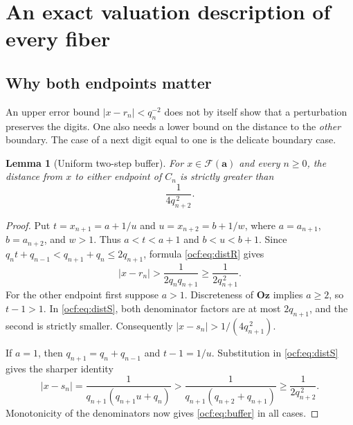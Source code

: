 \documentclass[11pt,a4paper]{article}
\numberwithin{equation}{section}
\newtheorem{lemma}[theorem]{Lemma}
\theoremstyle{definition}
\theoremstyle{remark}
\newcommand{\Oz}{\mathbf{Oz}}
\newcommand{\F}{\mathcal F}
\newcommand{\codea}{\boldsymbol a}
\begin{document}
\section{An exact valuation description of every fiber}
\label{ocf:sec:fibers}

\subsection{Why both endpoints matter}

An upper error bound $|x-r_n|<q_n^{-2}$ does not by itself show that a
perturbation preserves the digits. One also needs a lower bound on the
distance to the \emph{other} boundary. The case of a next digit equal to
one is the delicate boundary case.

\begin{lemma}[Uniform two-step buffer]\label{ocf:lem:buffer}
For $x\in\F(\codea)$ and every $n\ge0$, the distance from $x$ to either
endpoint of $C_n$ is strictly greater than
\begin{equation}\label{ocf:eq:buffer}
 \frac1{4q_{n+2}^{\,2}}.
\end{equation}
\end{lemma}
\begin{proof}
Put $t=x_{n+1}=a+1/u$ and $u=x_{n+2}=b+1/w$, where
$a=a_{n+1}$, $b=a_{n+2}$, and $w>1$. Thus $a<t<a+1$ and $b<u<b+1$.
Since $q_nt+q_{n-1}<q_{n+1}+q_n\le2q_{n+1}$, formula
\eqref{ocf:eq:distR} gives
\[
 |x-r_n|>\frac1{2q_nq_{n+1}}\ge\frac1{2q_{n+1}^{\,2}}.
\]
For the other endpoint first suppose $a>1$. Discreteness of $\Oz$ implies
$a\ge2$, so $t-1>1$. In \eqref{ocf:eq:distS}, both denominator factors are at
most $2q_{n+1}$, and the second is strictly smaller. Consequently
$|x-s_n|>1/(4q_{n+1}^{\,2})$.

If $a=1$, then $q_{n+1}=q_n+q_{n-1}$ and $t-1=1/u$. Substitution in
\eqref{ocf:eq:distS} gives the sharper identity
\[
 |x-s_n|=\frac1{q_{n+1}(q_{n+1}u+q_n)}
 >\frac1{q_{n+1}(q_{n+2}+q_{n+1})}
 \ge\frac1{2q_{n+2}^{\,2}}.
\]
Monotonicity of the denominators now gives \eqref{ocf:eq:buffer} in all cases.
\end{proof}
\end{document}
